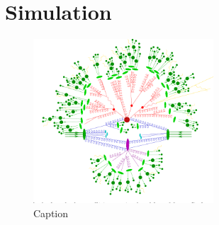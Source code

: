 
\section{Simulation}
\label{sec:cmsexperiment:simulation}

\begin{figure}[ht]
    \centering
    \includegraphics[width=0.6\textwidth]{chapters/CMSExperiment/sectionMCSimulation/figures/ps.png}
    \caption{Caption}
    \label{fig:cmsexperiment:simulation:ps}
\end{figure}
